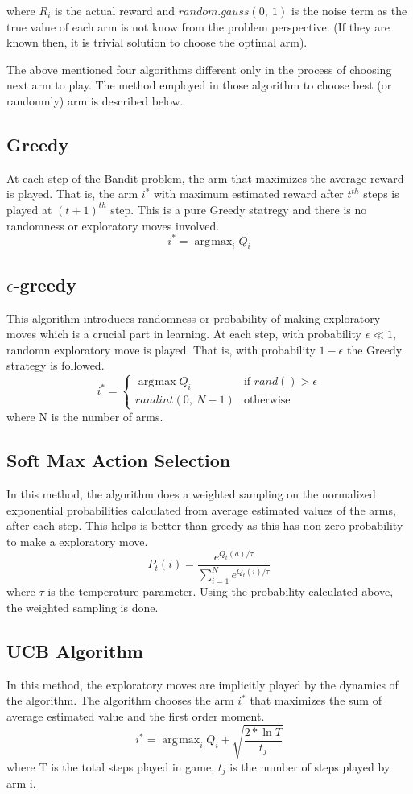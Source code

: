 \documentclass[a4paper,10pt]{report}
\DeclareMathOperator*{\argmax}{arg\!max}
\begin{document}
where $R_{i}$ is the actual reward and $random.gauss(0,\ 1)$ is the noise term as the true value of each arm is not know from the problem perspective. (If they are known then, it is trivial solution to choose the optimal arm).

The above mentioned four algorithms different only in the process of choosing next arm to play. The method employed in those algorithm to choose best (or randomnly) arm is described below.

\subsection{Greedy}
At each step of the Bandit problem, the arm that maximizes the average reward is played. That is, the arm $i^*$ with maximum estimated reward after \emph{$t^{th}$} steps is played at \emph{$(t+1)^{th}$} step. This is a pure Greedy statregy and there is no randomness or exploratory moves involved.
\[ i^{*} = \argmax_i Q_{i} \]
\subsection{$\epsilon$-greedy}
This algorithm introduces randomness or probability of making exploratory moves which is a crucial part in learning. At each step, with probability \emph{$\epsilon \ll 1$}, randomn exploratory move is played. That is, with probability \emph{$1 - \epsilon$} the Greedy strategy is followed.
\[ i^{*} = \begin{cases}
			\argmax Q_{i} & \text{if } rand() > \epsilon \\
			randint(0,\ N-1)& \text{otherwise}
  			\end{cases}
 \]
where N is the number of arms.
\subsection{Soft Max Action Selection}
In this method, the algorithm does a weighted sampling on the normalized exponential probabilities calculated from average estimated values of the arms, after each step. This helps is better than greedy as this has non-zero probability to make a exploratory move.
\[ P_{t}(i) = \frac{e^{Q_{t}(a)/\tau}}{\displaystyle\sum_{i=1}^{N} e^{Q_{t}(i)/\tau}}\]
where $\tau$ is the temperature parameter.
Using the probability calculated above, the weighted sampling is done.
\subsection{UCB Algorithm}
In this method, the exploratory moves are implicitly played by the dynamics of the algorithm. The algorithm chooses the arm $i^*$ that maximizes the sum of average estimated value and the first order moment.
\[ i^{*} = \argmax_i Q_{i} + \sqrt{\frac{2*\ln T}{t_j}} \]
where T is the total steps played in game, $t_j$ is the number of steps played by arm i.
\end{document}
